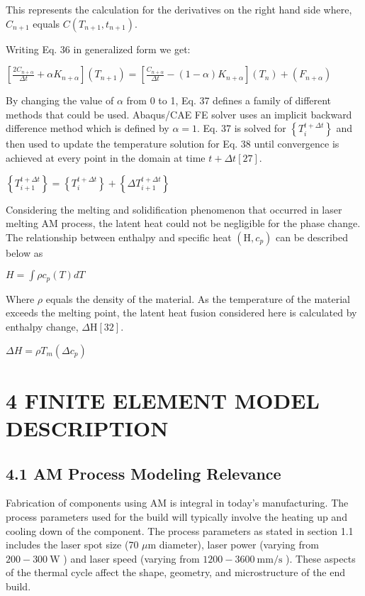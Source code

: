 \documentclass[10pt]{article}
\begin{document}
This represents the calculation for the derivatives on the right hand side where, $C_{n+1}$ equals $C\left(T_{n+1}, t_{n+1}\right)$.

Writing Eq. 36 in generalized form we get:

$\left[\frac{2 C_{n+\alpha}}{\Delta t}+\alpha K_{n+\alpha}\right]\left(T_{n+1}\right)=\left[\frac{C_{n+\alpha}}{\Delta t}-(1-\alpha) K_{n+\alpha}\right]\left(T_{n}\right)+\left(F_{n+\alpha}\right)$

By changing the value of $\alpha$ from 0 to 1, Eq. 37 defines a family of different methods that could be used. Abaqus/CAE FE solver uses an implicit backward difference method which is defined by $\alpha=1$. Eq. 37 is solved for $\left\{T_{i}^{t+\Delta t}\right\}$ and then used to update the temperature solution for Eq. 38 until convergence is achieved at every point in the domain at time $t+\Delta t[27]$.

$\left\{T_{i+1}^{t+\Delta t}\right\}=\left\{T_{i}^{t+\Delta t}\right\}+\left\{\Delta T_{i+1}^{t+\Delta t}\right\}$

Considering the melting and solidification phenomenon that occurred in laser melting AM process, the latent heat could not be negligible for the phase change. The relationship between enthalpy and specific heat $\left(\mathrm{H}, c_{p}\right)$ can be described below as

$H=\int \rho c_{p}(T) d T$

Where $\rho$ equals the density of the material. As the temperature of the material exceeds the melting point, the latent heat fusion considered here is calculated by enthalpy change, $\Delta \mathrm{H}[32]$.

$\Delta H=\rho T_{m}\left(\Delta c_{p}\right)$

\section*{4 FINITE ELEMENT MODEL DESCRIPTION}
\subsection*{4.1 AM Process Modeling Relevance}
Fabrication of components using AM is integral in today's manufacturing. The process parameters used for the build will typically involve the heating up and cooling down of the component. The process parameters as stated in section 1.1 includes the laser spot size (70 $\mu \mathrm{m}$ diameter), laser power (varying from $200-300 \mathrm{~W}$ ) and laser speed (varying from $1200-3600 \mathrm{~mm} / \mathrm{s}$ ). These aspects of the thermal cycle affect the shape, geometry, and microstructure of the end build.
\end{document}
